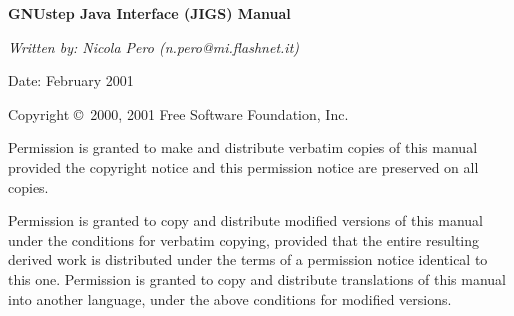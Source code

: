 %
%
%
\begin{titlepage}
\begin{flushleft}
{\phantom{begin page}}
\vskip6cm

{\LARGE\bf GNUstep Java Interface (JIGS) Manual\par}

\vskip1cm

{\sl Written by:  Nicola Pero (n.pero@mi.flashnet.it)

Date: February 2001}
\end{flushleft}

\vskip3cm

{\sc Copyright \copyright\ 2000, 2001 Free Software Foundation, Inc.}

Permission is granted to make and distribute verbatim copies of this
manual provided the copyright notice and this permission notice are
preserved on all copies.

Permission is granted to copy and distribute modified versions of this
manual under the conditions for verbatim copying, provided that the
entire resulting derived work is distributed under the terms of a
permission notice identical to this one.  Permission is granted to
copy and distribute translations of this manual into another language,
under the above conditions for modified versions.

\end{titlepage}





